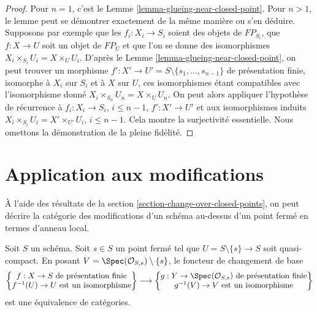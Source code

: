 \begin{proof}
Pour $n = 1$, c'est le Lemme \ref{lemma-glueing-near-closed-point}.
Pour $n > 1$, le lemme peut se démontrer exactement de la même manière ou
s'en déduire. Supposons par exemple que les $f_i : X_i \to S_i$
soient des objets de $FP_{S_i}$, que $f : X \to U$ soit un objet
de $FP_U$ et que l'on se donne des isomorphismes $X_i \times_{S_i} U_i = X \times_U U_i$.
D'après le Lemme \ref{lemma-glueing-near-closed-point}, on peut trouver
un morphisme $f' : X' \to U' = S \setminus \{s_1, \ldots, s_{n - 1}\}$
de présentation finie, isomorphe à
$X_i$ sur $S_i$ et à $X$ sur $U$, ces
isomorphismes étant compatibles avec l'isomorphisme donné
$X_i \times_{S_n} U_n = X \times_U U_n$.
On peut alors appliquer l'hypothèse de récurrence à
$f_i : X_i \to S_i$, $i \leq n - 1$,
$f' : X' \to U'$ et aux isomorphismes
induits $X_i \times_{S_i} U_i = X' \times_{U'} U_i$, $i \leq n - 1$.
Cela montre la surjectivité essentielle. Nous omettons la démonstration de
la pleine fidélité.
\end{proof}






\section{Application aux modifications}
\label{section-modifications-at-a-point}

\noindent
À l'aide des résultats de la section \ref{section-change-over-closed-points},
on peut décrire la catégorie des modifications d'un
schéma au-dessus d'un point fermé en termes d'anneau local.

\begin{lemma}
\label{lemma-modifications}
Soit $S$ un schéma. Soit $s \in S$ un point fermé tel que
$U = S \setminus \{s\} \to S$ soit quasi-compact. En posant
$V = \Spec(\mathcal{O}_{S, s}) \setminus \{s\}$, le foncteur de changement de base
$$
\left\{
\begin{matrix}
f : X \to S\text{ de présentation finie} \\
f^{-1}(U) \to U\text{ est un isomorphisme}
\end{matrix}
\right\}
\longrightarrow
\left\{
\begin{matrix}
g : Y \to \Spec(\mathcal{O}_{S, s})\text{ de présentation finie} \\
g^{-1}(V) \to V\text{ est un isomorphisme}
\end{matrix}
\right\}
$$
est une équivalence de catégories.
\end{lemma}

